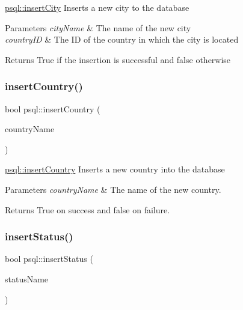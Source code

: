 \hyperlink{classpsql_a767b85014d9df3eac148730f18888d6d}{psql\+::insert\+City} Inserts a new city to the database 


\begin{DoxyParams}{Parameters}
{\em city\+Name} & The name of the new city \\
\hline
{\em country\+ID} & The ID of the country in which the city is located \\
\hline
\end{DoxyParams}
\begin{DoxyReturn}{Returns}
True if the insertion is successful and false otherwise 
\end{DoxyReturn}
\mbox{\label{classpsql_ab3b5934ce3fbc4be1730d990d4142893}} 
\subsubsection{\texorpdfstring{insert\+Country()}{insertCountry()}}
{\footnotesize\ttfamily bool psql\+::insert\+Country (\begin{DoxyParamCaption}\item[{Q\+String}]{country\+Name }\end{DoxyParamCaption})}



\hyperlink{classpsql_ab3b5934ce3fbc4be1730d990d4142893}{psql\+::insert\+Country} Inserts a new country into the database 


\begin{DoxyParams}{Parameters}
{\em country\+Name} & The name of the new country. \\
\hline
\end{DoxyParams}
\begin{DoxyReturn}{Returns}
True on success and false on failure. 
\end{DoxyReturn}
\mbox{\label{classpsql_a601ee0bdc9430b1d674a857f7c94b767}} 
\subsubsection{\texorpdfstring{insert\+Status()}{insertStatus()}}
{\footnotesize\ttfamily bool psql\+::insert\+Status (\begin{DoxyParamCaption}\item[{Q\+String}]{status\+Name }\end{DoxyParamCaption})}



